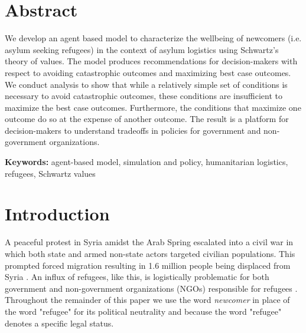 \documentclass{scspaperproc}
\theoremstyle{scsthe}
\begin{document}
\maketitle

\section*{Abstract}

We develop an agent based model to characterize the wellbeing of newcomers (i.e. asylum seeking refugees) in the context of asylum logistics using Schwartz's theory of values. The model produces recommendations for decision-makers with respect to avoiding catastrophic outcomes and maximizing best case outcomes. We conduct analysis to show that while a relatively simple set of conditions is necessary to avoid catastrophic outcomes, these conditions are insufficient to maximize the best case outcomes. Furthermore, the conditions that maximize one outcome do so at the expense of another outcome. The result is a platform for decision-makers to understand tradeoffs in policies for government and non-government organizations.

\textbf{Keywords:} agent-based model, simulation and policy, humanitarian logistics, refugees, Schwartz values

\section{Introduction}
\label{sec:intro}
A peaceful protest in Syria amidst the Arab Spring escalated into a civil war in which both state and armed non-state actors targeted civilian populations. This prompted forced migration resulting in 1.6 million people being displaced from Syria \cite{42,90}. An influx of refugees, like this, is logistically problematic for both government and non-government organizations (NGOs) responsible for refugees \cite{66}. Throughout the remainder of this paper we use the word \emph{newcomer} in place of the word "refugee" for its political neutrality and because the word "refugee" denotes a specific legal status. 

\end{document}
